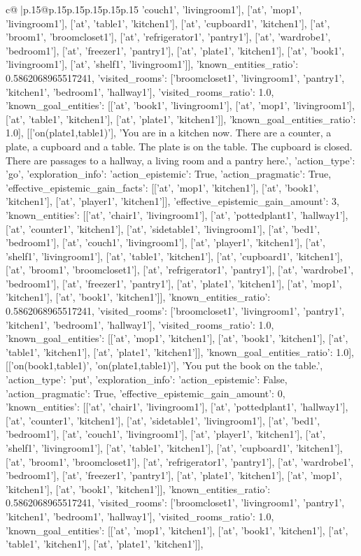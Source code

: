 \documentclass{article}
\begin{document}
{\begin{supertabular}{c@{$\;$}|p{.15\linewidth}@{}p{.15\linewidth}p{.15\linewidth}p{.15\linewidth}p{.15\linewidth}p{.15\linewidth}}
{{{'couch1', 'livingroom1'], ['at', 'mop1', 'livingroom1'], ['at', 'table1', 'kitchen1'], ['at', 'cupboard1', 'kitchen1'], ['at', 'broom1', 'broomcloset1'], ['at', 'refrigerator1', 'pantry1'], ['at', 'wardrobe1', 'bedroom1'], ['at', 'freezer1', 'pantry1'], ['at', 'plate1', 'kitchen1'], ['at', 'book1', 'livingroom1'], ['at', 'shelf1', 'livingroom1']], 'known_entities_ratio': 0.5862068965517241, 'visited_rooms': ['broomcloset1', 'livingroom1', 'pantry1', 'kitchen1', 'bedroom1', 'hallway1'], 'visited_rooms_ratio': 1.0, 'known_goal_entities': [['at', 'book1', 'livingroom1'], ['at', 'mop1', 'livingroom1'], ['at', 'table1', 'kitchen1'], ['at', 'plate1', 'kitchen1']], 'known_goal_entities_ratio': 1.0}}], [['on(plate1,table1)'], 'You are in a kitchen now. There are a counter, a plate, a cupboard and a table. The plate is on the table. The cupboard is closed. There are passages to a hallway, a living room and a pantry here.', {'action_type': 'go', 'exploration_info': {'action_epistemic': True, 'action_pragmatic': True, 'effective_epistemic_gain_facts': [['at', 'mop1', 'kitchen1'], ['at', 'book1', 'kitchen1'], ['at', 'player1', 'kitchen1']], 'effective_epistemic_gain_amount': 3, 'known_entities': [['at', 'chair1', 'livingroom1'], ['at', 'pottedplant1', 'hallway1'], ['at', 'counter1', 'kitchen1'], ['at', 'sidetable1', 'livingroom1'], ['at', 'bed1', 'bedroom1'], ['at', 'couch1', 'livingroom1'], ['at', 'player1', 'kitchen1'], ['at', 'shelf1', 'livingroom1'], ['at', 'table1', 'kitchen1'], ['at', 'cupboard1', 'kitchen1'], ['at', 'broom1', 'broomcloset1'], ['at', 'refrigerator1', 'pantry1'], ['at', 'wardrobe1', 'bedroom1'], ['at', 'freezer1', 'pantry1'], ['at', 'plate1', 'kitchen1'], ['at', 'mop1', 'kitchen1'], ['at', 'book1', 'kitchen1']], 'known_entities_ratio': 0.5862068965517241, 'visited_rooms': ['broomcloset1', 'livingroom1', 'pantry1', 'kitchen1', 'bedroom1', 'hallway1'], 'visited_rooms_ratio': 1.0, 'known_goal_entities': [['at', 'mop1', 'kitchen1'], ['at', 'book1', 'kitchen1'], ['at', 'table1', 'kitchen1'], ['at', 'plate1', 'kitchen1']], 'known_goal_entities_ratio': 1.0}}], [['on(book1,table1)', 'on(plate1,table1)'], 'You put the book on the table.', {'action_type': 'put', 'exploration_info': {'action_epistemic': False, 'action_pragmatic': True, 'effective_epistemic_gain_amount': 0, 'known_entities': [['at', 'chair1', 'livingroom1'], ['at', 'pottedplant1', 'hallway1'], ['at', 'counter1', 'kitchen1'], ['at', 'sidetable1', 'livingroom1'], ['at', 'bed1', 'bedroom1'], ['at', 'couch1', 'livingroom1'], ['at', 'player1', 'kitchen1'], ['at', 'shelf1', 'livingroom1'], ['at', 'table1', 'kitchen1'], ['at', 'cupboard1', 'kitchen1'], ['at', 'broom1', 'broomcloset1'], ['at', 'refrigerator1', 'pantry1'], ['at', 'wardrobe1', 'bedroom1'], ['at', 'freezer1', 'pantry1'], ['at', 'plate1', 'kitchen1'], ['at', 'mop1', 'kitchen1'], ['at', 'book1', 'kitchen1']], 'known_entities_ratio': 0.5862068965517241, 'visited_rooms': ['broomcloset1', 'livingroom1', 'pantry1', 'kitchen1', 'bedroom1', 'hallway1'], 'visited_rooms_ratio': 1.0, 'known_goal_entities': [['at', 'mop1', 'kitchen1'], ['at', 'book1', 'kitchen1'], ['at', 'table1', 'kitchen1'], ['at', 'plate1', 'kitchen1']], }}}
\end{supertabular}}
\end{document}
